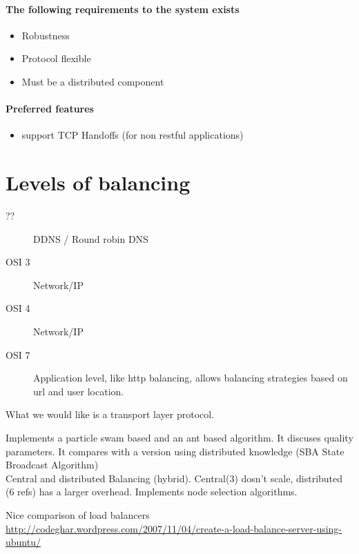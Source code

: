 \paragraph{The following requirements to the system exists}
\begin{itemize}
	\item Robustness
	\item Protocol flexible
	\item Must be a distributed component
\end{itemize}

\paragraph{Preferred features}
\begin{itemize}
	\item support TCP Handoffs (for non restful applications)
\end{itemize}

\section{Levels of balancing}
\begin{description}
	\item[??] DDNS / Round robin DNS
	\item[OSI 3] Network/IP %
	\item[OSI 4] Network/IP
	\item[OSI 7] {Application level, like http balancing, allows balancing strategies based on url and user location.}
\end{description}

What we would like is a transport layer protocol.
\vspace{1cm}

\noindent\cite{Ludwig:SwarmIntelligenceGridLoadBalancing} 
Implements a particle swam based and an ant based algorithm. 
It discuses quality parameters.
It compares with a version using distributed knowledge (SBA State Broadcast Algorithm)
\\

\noindent\cite{MayuriMehta:HybridDynamicLB} Central and distributed Balancing (hybrid). Central(3) dosn't scale, distributed (6 refs) has a larger overhead. Implements node selection algorithms.

Nice comparison of load balancers
\url{http://codeghar.wordpress.com/2007/11/04/create-a-load-balance-server-using-ubuntu/}

